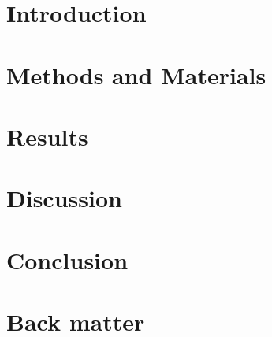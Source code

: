 \documentclass{optica-article}
\begin{document}
\begin{abstract*} 

\end{abstract*}

\section{Introduction}


\section{Methods and Materials}


\section{Results}


\section{Discussion}
 

\section{Conclusion}
 

\section{Back matter}
\end{document}
